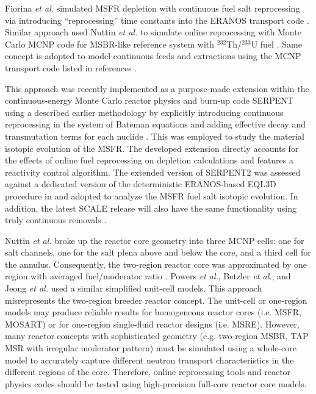 Fiorina \emph{et al.} simulated 
\gls{MSFR} depletion with continuous fuel salt reprocessing via introducing 
``reprocessing'' time constants into the ERANOS transport code 
\cite{fiorina_investigation_2013}. Similar approach used Nuttin \emph{et al.} to 
simulate online reprocessing with Monte Carlo MCNP code for \gls{MSBR}-like reference 
system with $^{232}$Th/$^{233}$U fuel \cite{nuttin_potential_2005}.
Same concept is adopted to model continuous feeds and extractions using the MCNP transport code listed in references \cite{doligez_coupled_2014,heuer_towards_2014}. 

This approach was recently implemented as a purpose-made extension within the continuous-energy Monte Carlo reactor physics and burn-up code SERPENT \cite{aufiero_extended_2013} 
using a described earlier methodology by explicitly introducing 
continuous reprocessing in the system of Bateman equations and adding effective 
decay and transmutation terms for each nuclide 
\cite{aufiero_extended_2013}. This was employed to study the material isotopic evolution of the \gls{MSFR}\cite{aufiero_extended_2013}. The developed extension directly 
accounts for the effects of online fuel 
reprocessing on depletion calculations and features a reactivity control 
algorithm. The extended version of SERPENT2 was assessed against a dedicated 
version of the deterministic ERANOS-based EQL3D procedure in
\cite{ruggieri_eranos_2006, fiorina_investigation_2013} and adopted to analyze 
the \gls{MSFR} fuel salt isotopic evolution. In addition, the latest SCALE release 
will also have the same functionality using truly continuous removals \cite{betzler_implementation_2017}. 

Nuttin \emph{et al.} broke up the reactor core geometry into three \gls{MCNP} cells: 
one for salt channels, one for the salt plena above and below the core, and a 
third cell for the annulus. Consequently, the two-region reactor core was 
approximated by one region with averaged fuel/moderator ratio 
\cite{nuttin_potential_2005}.  Powers \emph{et 
al.}, Betzler \emph{et al.}, and Jeong \emph{et al.} 
\cite{powers_new_2013,powers_inventory_2014,betzler_modeling_2016, 
betzler_molten_2017, jeong_development_2014, jeong_equilibrium_2016} used a 
similar simplified unit-cell models. This approach 
misrepresents the two-region breeder reactor concept. The unit-cell or one-region 
models may produce reliable results for homogeneous reactor cores (i.e. 
\gls{MSFR}, \gls{MOSART}) or for one-region single-fluid reactor designs (i.e. 
\gls{MSRE}). However, many reactor concepts with sophisticated geometry (e.g. 
two-region \gls{MSBR}, \gls{TAP} \gls{MSR} with irregular moderator pattern) must 
be simulated using a whole-core model to accurately capture different neutron 
transport characteristics in the 
different regions of the core. Therefore, online reprocessing tools and reactor 
physics codes should be tested using high-precision full-core reactor core models.

